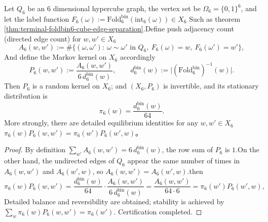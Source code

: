\begin{enumerate}
  

\begin{theorem}\label{thm:terminal-foldbin6-pushforward-markov}Let \(Q_6\) be an \(6\) dimensional hypercube graph, the vertex set be \(\Omega_6=\{0,1\}^6\), and let the label function  \(
  F_6(\omega):=\mathrm{Fold}^{\mathrm{bin}}_6(\mathrm{int}_6(\omega))\in X_6
  \)
Such as theorem \ref{thm:terminal-foldbin6-cube-edge-separation}.Define push adjacency count (directed edge count) for \(w,w'\in X_6\)  \[
  A_6(w,w')
  :=\#\bigl\{(\omega,\omega'):\ \omega\sim\omega'\text{ in }Q_6,\ F_6(\omega)=w,\ F_6(\omega')=w'\bigr\},
  \]
And define the Markov kernel on \(X_6\) accordingly  \[
  P_6(w,w'):=\frac{A_6(w,w')}{6\,d^{\mathrm{bin}}_6(w)},
  \qquad d^{\mathrm{bin}}_6(w):=\bigl|(\mathrm{Fold}^{\mathrm{bin}}_6)^{-1}(w)\bigr|.
  \]
Then \(P_6\) is a random kernel on \(X_6\); and \((X_6,P_6)\) is invertible, and its stationary distribution is  \[
  \pi_6(w)=\frac{d^{\mathrm{bin}}_6(w)}{64}.
  \]
More strongly, there are detailed equilibrium identities for any \(w,w'\in X_6\)  \(
  \pi_6(w)P_6(w,w')=\pi_6(w')P_6(w',w)
  \)。
  \end{theorem}
  \begin{proof}
By definition \(\sum_{w'}A_6(w,w')=6\,d^{\mathrm{bin}}_6(w)\), the row sum of \(P_6\) is \(1\).On the other hand, the undirected edges of \(Q_6\) appear the same number of times in \(A_6(w,w')\) and \(A_6(w',w)\), so \(A_6(w,w')=A_6(w',w)\).then  \[
  \pi_6(w)P_6(w,w')=\frac{d^{\mathrm{bin}}_6(w)}{64}\cdot\frac{A_6(w,w')}{6\,d^{\mathrm{bin}}_6(w)}
  =\frac{A_6(w,w')}{64\cdot 6}
  =\pi_6(w')P_6(w',w),
  \]
Detailed balance and reversibility are obtained; stability is achieved by \(\sum_w \pi_6(w)P_6(w,w')=\pi_6(w')\). Certification completed.  \end{proof}
  

  


\end{enumerate}
